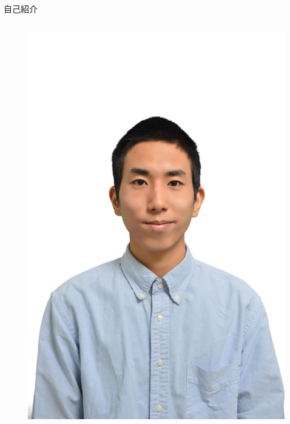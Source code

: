 \documentclass[12pt, unicode]{beamer}
\begin{document}
\begin{frame}{自己紹介}
\begin{columns}
    \begin{column}{0.25\textwidth}
      \begin{figure}[h]
        \centering
        \includegraphics[width=\textwidth]{pictures/IDPhoto.jpg}
      \end{figure}
    \end{column}
  \end{columns}
\end{frame}
\end{document}
